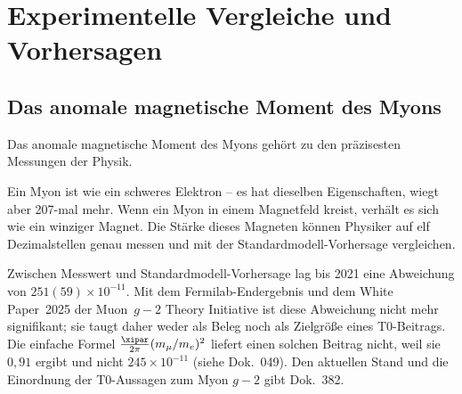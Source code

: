 	\begin{table}[H]
		\centering
		\caption{T0-Deutung der Naturkonstanten}
	\end{table}
	
	\section{Experimentelle Vergleiche und Vorhersagen}
	
	\subsection{Das anomale magnetische Moment des Myons}
	
		Das anomale magnetische Moment des Myons gehört zu den präzisesten Messungen der Physik.

	Ein Myon ist wie ein schweres Elektron -- es hat dieselben Eigenschaften, wiegt aber 207-mal mehr. Wenn ein Myon in einem Magnetfeld kreist, verhält es sich wie ein winziger Magnet. Die Stärke dieses Magneten können Physiker auf elf Dezimalstellen genau messen und mit der Standardmodell-Vorhersage vergleichen.

	Zwischen Messwert und Standardmodell-Vorhersage lag bis 2021 eine Abweichung von $251(59) \times 10^{-11}$. Mit dem Fermilab-Endergebnis und dem White Paper~2025 der Muon~$g-2$ Theory Initiative ist diese Abweichung nicht mehr signifikant; sie taugt daher weder als Beleg noch als Zielgröße eines T0-Beitrags. Die einfache Formel $\frac{\xipar}{2\pi}(m_\mu/m_e)^2$ liefert einen solchen Beitrag nicht, weil sie $0{,}91$ ergibt und nicht $245\times10^{-11}$ (siehe Dok.~049). Den aktuellen Stand und die Einordnung der T0-Aussagen zum Myon $g-2$ gibt Dok.~382.

